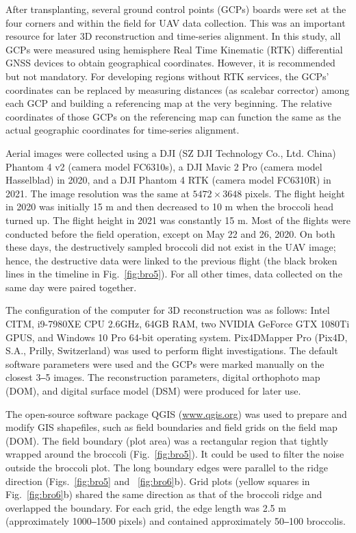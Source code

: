 After transplanting, several ground control points (GCPs) boards were set at the four corners and within the field for UAV data collection. This was an important resource for later 3D reconstruction and time-series alignment. In this study, all GCPs were measured using hemisphere Real Time Kinematic (RTK) differential GNSS devices to obtain geographical coordinates. However, it is recommended but not mandatory. For developing regions without RTK services, the GCPs' coordinates can be replaced by measuring distances (as scalebar corrector) among each GCP and building a referencing map at the very beginning. The relative coordinates of those GCPs on the referencing map can function the same as the actual geographic coordinates for time-series alignment.

Aerial images were collected using a DJI (SZ DJI Technology Co., Ltd. China) Phantom 4 v2 (camera model FC6310s), a DJI Mavic 2 Pro (camera model Hasselblad) in 2020, and a DJI Phantom 4 RTK (camera model FC6310R) in 2021. The image resolution was the same at $5472 \times 3648$ pixels. The flight height in 2020 was initially 15 m and then decreased to 10 m when the broccoli head turned up. The flight height in 2021 was constantly 15 m. Most of the flights were conducted before the field operation, except on May 22 and 26, 2020. On both these days, the destructively sampled broccoli did not exist in the UAV image; hence, the destructive data were linked to the previous flight (the black broken lines in the timeline in Fig.~\ref{fig:bro5}). For all other times, data collected on the same day were paired together.

The configuration of the computer for 3D reconstruction was as follows: Intel CITM, i9-7980XE CPU \@2.6GHz, 64GB RAM, two NVIDIA GeForce GTX 1080Ti GPUS, and Windows 10 Pro 64-bit operating system. Pix4DMapper Pro (Pix4D, S.A., Prilly, Switzerland) was used to perform flight investigations. The default software parameters were used and the GCPs were marked manually on the closest 3‒5 images. The reconstruction parameters, digital orthophoto map (DOM), and digital surface model (DSM) were produced for later use. 

The open-source software package QGIS (\url{www.qgis.org}) was used to prepare and modify GIS shapefiles, such as field boundaries and field grids on the field map (DOM). The field boundary (plot area) was a rectangular region that tightly wrapped around the broccoli (Fig.~\ref{fig:bro5}). It could be used to filter the noise outside the broccoli plot. The long boundary edges were parallel to the ridge direction (Figs.~\ref{fig:bro5} and ~\ref{fig:bro6}b). Grid plots (yellow squares in Fig.~\ref{fig:bro6}b) shared the same direction as that of the broccoli ridge and overlapped the boundary. For each grid, the edge length was 2.5 m (approximately 1000‒1500 pixels) and contained approximately 50‒100 broccolis. 

